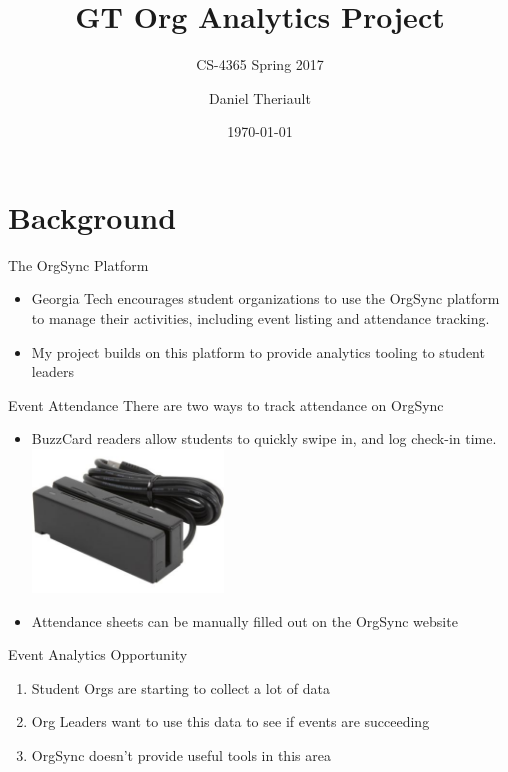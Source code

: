 \documentclass{beamer}
\title{GT Org Analytics Project}
\subtitle{CS-4365 Spring 2017}
\author{Daniel Theriault}
\date{\today}
\begin{document}
\maketitle

\section{Background}
\begin{frame}{The OrgSync Platform}
    \begin{itemize}
        \item Georgia Tech encourages student organizations to use the OrgSync platform to
            manage their activities, including event listing and attendance tracking.
        \item My project builds on this platform to provide analytics tooling to student leaders
    \end{itemize}
\end{frame}

\begin{frame}{Event Attendance}
    There are two ways to track attendance on OrgSync
    \begin{itemize}
        \item BuzzCard readers allow students to quickly swipe in, and log check-in time.
            \newline\includegraphics[width=2in]{./media/cardreader.jpg}
        \item Attendance sheets can be manually filled out on the OrgSync website
    \end{itemize}
\end{frame}

\begin{frame}{Event Analytics Opportunity}
    \begin{enumerate}
        \item Student Orgs are starting to collect a lot of data
        \item Org Leaders want to use this data to see if events are succeeding
        \item OrgSync doesn't provide useful tools in this area
    \end{enumerate}
\end{frame}    
\end{document}
